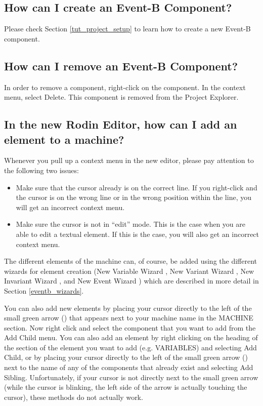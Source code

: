 \subsection{How can I create an Event-B Component?}

Please check Section \ref{tut_project_setup} to learn how to create a new Event-B component.

\subsection{How can I remove an Event-B Component?}

In order to remove a component, right-click on the component. In the context menu, select \textsf{Delete}. This component is removed from the \textsf{Project Explorer}. 

\subsection{In the new Rodin Editor, how can I add an element to a machine?}
\label{faq_new_editor_new_element}



Whenever you pull up a context menu in the new editor, please pay attention to the following two issues:
\begin{itemize}
	\item Make sure that the cursor already is on the correct line.  If you right-click and the cursor is on the wrong line or in the wrong position within the line, you will get an incorrect context menu.
	\item Make sure the cursor is not in ``edit'' mode. This is the case when you are able to edit a textual element.  If this is the case, you will also get an incorrect context menu.
\end{itemize}

The different elements of the machine can, of course, be added using the different wizards for element creation (New Variable Wizard , New Variant Wizard , New Invariant Wizard , and New Event Wizard ) which are described in more detail in Section \ref{eventb_wizards}. 

You can also add new elements by placing your cursor directly to the left of the small green arrow () that appears next to your machine name in the \textsf{MACHINE} section. Now right click and select the component that you want to add from the \textsf{Add Child} menu. You can also add an element by right clicking on the heading of the section of the element you want to add (e.g. \textsf{VARIABLES}) and selecting \textsf{Add Child}, or by placing your cursor directly to the left of the small green arrow () next to the name of any of the components that already exist and selecting \textsf{Add Sibling}. Unfortunately, if your cursor is not directly next to the small green arrow (while the cursor is blinking, the left side of the arrow is actually touching the cursor), these methods do not actually work. 

